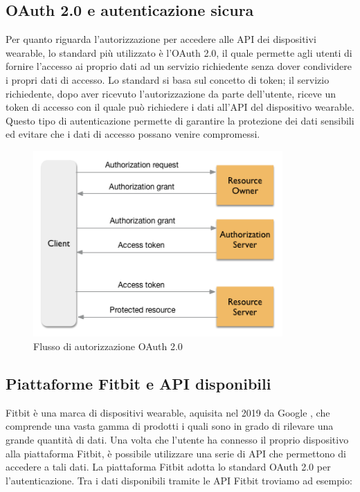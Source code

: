\documentclass[12pt,a4paper,oneside]{report}
\begin{document}
\subsection{OAuth 2.0 e autenticazione sicura}
Per quanto riguarda l'autorizzazione per accedere alle API dei dispositivi wearable, lo standard più utilizzato è l'OAuth 2.0, il quale permette agli utenti di fornire l'accesso ai proprio dati ad un servizio richiedente senza dover condividere i propri dati di accesso.
Lo standard si basa sul concetto di token; il servizio richiedente, dopo aver ricevuto l'autorizzazione da parte dell'utente, riceve un token di accesso con il quale può richiedere i dati all'API del dispositivo wearable.
Questo tipo di autenticazione permette di garantire la protezione dei dati sensibili ed evitare che i dati di accesso possano venire compromessi.
\begin{figure}[H]
    \centering
    \includegraphics[width=0.85\textwidth]{images/oauth-abstract.png}
    \caption{Flusso di autorizzazione OAuth 2.0 \cite{oauth-image}}
    \label{fig:oauth-flow}
\end{figure}

\subsection{Piattaforme Fitbit e API disponibili}
Fitbit è una marca di dispositivi wearable, aquisita nel 2019 da Google \cite{fitbit}, che comprende una vasta gamma di prodotti i quali sono in grado di rilevare una grande quantità di dati.
Una volta che l'utente ha connesso il proprio dispositivo alla piattaforma Fitbit, è possibile utilizzare una serie di API che permettono di accedere a tali dati. La piattaforma Fitbit adotta lo standard OAuth 2.0 per l'autenticazione.
Tra i dati disponibili tramite le API Fitbit troviamo ad esempio:
\end{document}
